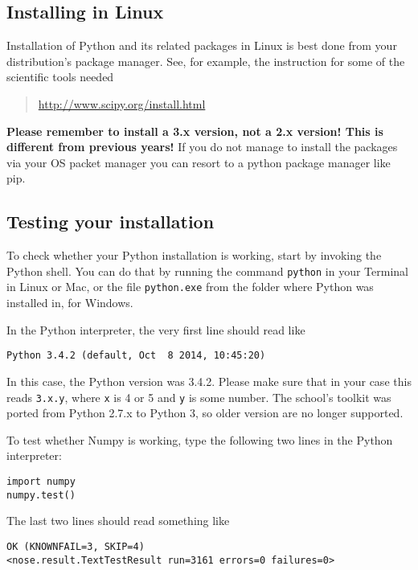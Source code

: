 \subsection{Installing in Linux}

Installation of Python and its related packages in Linux is best done from your
distribution's package manager. See, for example, the instruction for some of the
scientific tools needed 

\begin{quotation}
\url{http://www.scipy.org/install.html}
\end{quotation}

\textbf{Please remember to install a 3.x version, not a 2.x version! This is different from previous years!}
    If you do not manage to install the packages via your OS packet manager you can
resort to a python package manager like pip.  

\subsection{Testing your installation}

To check whether your Python installation is working, start by invoking the
Python shell. You can do that by running the command \verb+python+ in your
Terminal in Linux or Mac, or the file \verb+python.exe+ from the folder where
Python was installed in, for Windows.

In the Python interpreter, the very first line should read like
\begin{verbatim}
Python 3.4.2 (default, Oct  8 2014, 10:45:20)
\end{verbatim}
%
In this case, the Python version was 3.4.2. Please make sure that in your case
this reads \verb+3.x.y+, where \verb+x+ is 4 or 5 and \verb+y+ is some number.
    The school's toolkit was ported from Python 2.7.x to Python 3, so older version are no longer supported.

To test whether Numpy is working, type the following two lines in the Python interpreter:
%
\begin{verbatim}
import numpy
numpy.test()
\end{verbatim}
%
The last two lines should read something like
%
\begin{verbatim}
OK (KNOWNFAIL=3, SKIP=4)
<nose.result.TextTestResult run=3161 errors=0 failures=0>
\end{verbatim}

